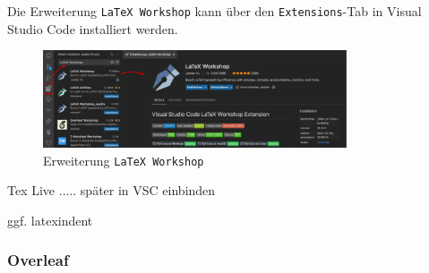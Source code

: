 Die Erweiterung \texttt{LaTeX Workshop} kann über den \texttt{Extensions}-Tab in Visual Studio Code installiert werden.
\begin{figure}[H]
    \centering
    \includegraphics[width=0.8\textwidth]{anlagen/bilder/Latex_Workshop_Ext.pdf}
    \caption{Erweiterung \texttt{LaTeX Workshop}}
    \label{fig:visual_studio_code_latex_workshop}
\end{figure}

Tex Live .....
später in VSC einbinden













ggf. latexindent


\subsubsection{Overleaf}
\label{sec:overleaf}



































\newpage